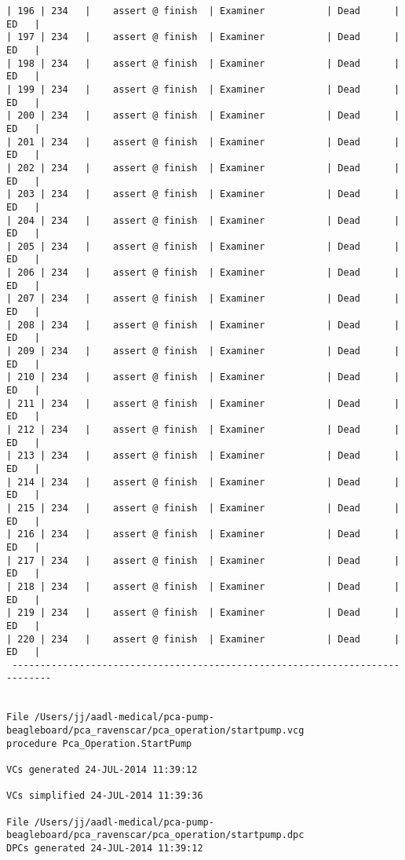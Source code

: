\begin{lstlisting}[frame=single, gobble=0, caption={POGS report for PCA Pump prototype}]
| 196 | 234   |    assert @ finish  | Examiner           | Dead      |   ED   |
| 197 | 234   |    assert @ finish  | Examiner           | Dead      |   ED   |
| 198 | 234   |    assert @ finish  | Examiner           | Dead      |   ED   |
| 199 | 234   |    assert @ finish  | Examiner           | Dead      |   ED   |
| 200 | 234   |    assert @ finish  | Examiner           | Dead      |   ED   |
| 201 | 234   |    assert @ finish  | Examiner           | Dead      |   ED   |
| 202 | 234   |    assert @ finish  | Examiner           | Dead      |   ED   |
| 203 | 234   |    assert @ finish  | Examiner           | Dead      |   ED   |
| 204 | 234   |    assert @ finish  | Examiner           | Dead      |   ED   |
| 205 | 234   |    assert @ finish  | Examiner           | Dead      |   ED   |
| 206 | 234   |    assert @ finish  | Examiner           | Dead      |   ED   |
| 207 | 234   |    assert @ finish  | Examiner           | Dead      |   ED   |
| 208 | 234   |    assert @ finish  | Examiner           | Dead      |   ED   |
| 209 | 234   |    assert @ finish  | Examiner           | Dead      |   ED   |
| 210 | 234   |    assert @ finish  | Examiner           | Dead      |   ED   |
| 211 | 234   |    assert @ finish  | Examiner           | Dead      |   ED   |
| 212 | 234   |    assert @ finish  | Examiner           | Dead      |   ED   |
| 213 | 234   |    assert @ finish  | Examiner           | Dead      |   ED   |
| 214 | 234   |    assert @ finish  | Examiner           | Dead      |   ED   |
| 215 | 234   |    assert @ finish  | Examiner           | Dead      |   ED   |
| 216 | 234   |    assert @ finish  | Examiner           | Dead      |   ED   |
| 217 | 234   |    assert @ finish  | Examiner           | Dead      |   ED   |
| 218 | 234   |    assert @ finish  | Examiner           | Dead      |   ED   |
| 219 | 234   |    assert @ finish  | Examiner           | Dead      |   ED   |
| 220 | 234   |    assert @ finish  | Examiner           | Dead      |   ED   |
 -----------------------------------------------------------------------------


File /Users/jj/aadl-medical/pca-pump-beagleboard/pca_ravenscar/pca_operation/startpump.vcg
procedure Pca_Operation.StartPump

VCs generated 24-JUL-2014 11:39:12

VCs simplified 24-JUL-2014 11:39:36

File /Users/jj/aadl-medical/pca-pump-beagleboard/pca_ravenscar/pca_operation/startpump.dpc
DPCs generated 24-JUL-2014 11:39:12


\end{lstlisting}
